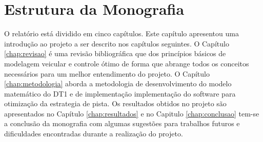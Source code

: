 \section{Estrutura da Monografia}
\label{sec:organizacao}

O relatório está dividido em cinco capítulos. Este capítulo apresentou uma introdução ao projeto a ser descrito nos capítulos seguintes. 
O Capítulo \ref{chap:revisao} é uma revisão bibliográfica que dos princípios básicos de modelagem veicular e controle ótimo de forma que abrange todos os
conceitos necessários para um melhor entendimento do projeto. O Capítulo \ref{chap:metodologia} aborda a metodologia de desenvolvimento do modelo matemático do DT1 e de implementação implementação do software
para otimização da estrategia de pista. Os resultados obtidos no projeto são apresentados no Capítulo \ref{chap:resultados} e no 
Capitulo \ref{chap:conclusao} tem-se a conclusão da monografia com algumas sugestões para trabalhos futuros e dificuldades encontradas durante a realização do projeto.

\clearpage